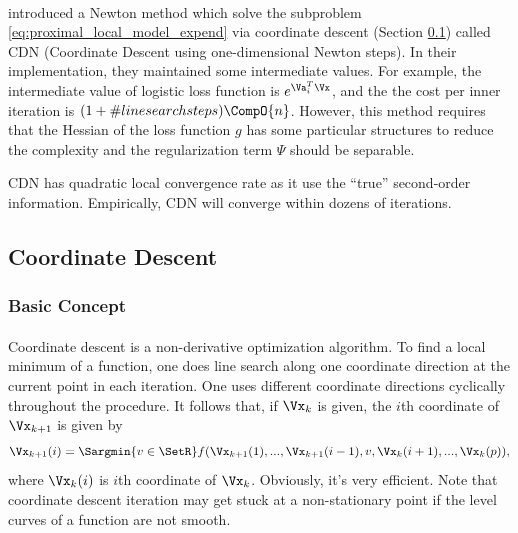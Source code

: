 \documentclass[
10pt, %
a4paper, %
oneside, %
headinclude,footinclude, %
BCOR5mm, %
]{scrartcl}
\begin{document}
\paragraph{}
\citet{fan2008liblinear} introduced a Newton method which solve the subproblem 
\eqref{eq:proximal_local_model_expend} via coordinate descent (Section 
\ref{sec:coordinatedescent}) called CDN (Coordinate Descent using 
one-dimensional Newton steps). In their implementation, they maintained some 
intermediate values. For example, the intermediate value of logistic loss 
function is $ e^{\Va_i^T \Vx} $, and the the cost per inner iteration is $ (1 + 
\# line search steps) \CompO{n} $. However, this method requires that the 
Hessian of the loss function $g$ has some particular structures to reduce the 
complexity and the regularization term $\Psi $ should be separable.

CDN has quadratic local convergence rate as it use the ``true'' 
second-order information. Empirically, CDN will converge within dozens of 
iterations.

\subsection{Coordinate Descent}
\label{sec:coordinatedescent}
\subsubsection{Basic Concept}
\paragraph{}
Coordinate descent is a non-derivative 
optimization algorithm. To find a local minimum of a function, one does line 
search along one coordinate direction at the current point in each iteration. 
One uses different coordinate directions cyclically throughout the procedure. 
It follows that, if $\mathbf{\Vx}_k$ is given, the $ i $th coordinate of 
$\mathbf{\Vx}_{k+1}$ is given by
\begin{equation*}
	\Vx_{k+1}(i) = \Sargmin{v \in \SetR} f(\Vx_{k+1}(1),..., \Vx_{k+1}(i-1),
	v, \Vx_k(i+1),...,\Vx_k(p)),
\end{equation*}
where $\Vx_k(i)$ is $i$th coordinate of $\Vx_k$.
Obviously, it's very efficient. Note that coordinate descent iteration may get 
stuck at a non-stationary point if the level curves of a function are not 
smooth.
\end{document}
